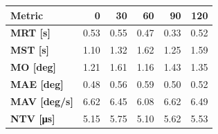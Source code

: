 \begin{tabular*}{\textwidth}{@{\extracolsep{\fill}}l|rrrrr}
    \toprule
    \textbf{Metric} & \textbf{0} & \textbf{30} & \textbf{60} & \textbf{90} & \textbf{120} \\
    \midrule
    \textbf{MRT [s]} & 0.53 & 0.55 & 0.47 & 0.33 & 0.52 \\
    \textbf{MST [s]} & 1.10 & 1.32 & 1.62 & 1.25 & 1.59 \\
    \textbf{MO  [deg]} & 1.21 & 1.61 & 1.16 & 1.43 & 1.35 \\
    \textbf{MAE [deg]} & 0.48 & 0.56 & 0.59 & 0.50 & 0.52 \\
    \textbf{MAV [deg/s]} & 6.62 & 6.45 & 6.08 & 6.62 & 6.49 \\
    \textbf{NTV [\si{\micro\second}]} & 5.15 & 5.75 & 5.10 & 5.62 & 5.53 \\
    \bottomrule
\end{tabular*}

